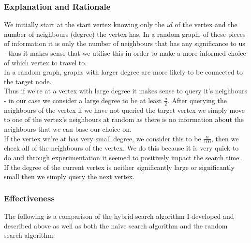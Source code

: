 \documentclass[12pt, a4paper]{article}
\begin{document}
\subsubsection*{Explanation and Rationale}
We initially start at the start vertex knowing only the $id$ of the vertex and the number of neighbours (degree) the vertex has. In a random graph, of these pieces of information it is only the number of neighbours that has any significance to us - thus it makes sense that we utilise this in order to make a more informed choice of which vertex to travel to.\\
In a random graph, graphs with larger degree are more likely to be connected to the target node.\\
Thus if we're at a vertex with large degree it makes sense to query it's neighbours - in our case we consider a large degree to be at least $\frac{n}{2}$. After querying the neighbours of the vertex if we have not queried the target vertex we simply move to one of the vertex's neighbours at random as there is no information about the neighbours that we can base our choice on.\\
If the vertex we're at has very small degree, we consider this to be $\frac{n}{100}$, then we check all of the neighbours of the vertex. We do this because it is very quick to do and through experimentation it seemed to positively impact the search time.\\
If the degree of the current vertex is neither significantly large or significantly small then we simply query the next vertex.
\subsubsection*{Effectiveness}
The following is a comparison of the hybrid search algorithm I developed and described above as well as both the naive search algorithm and the random search algorithm:\\
\end{document}
